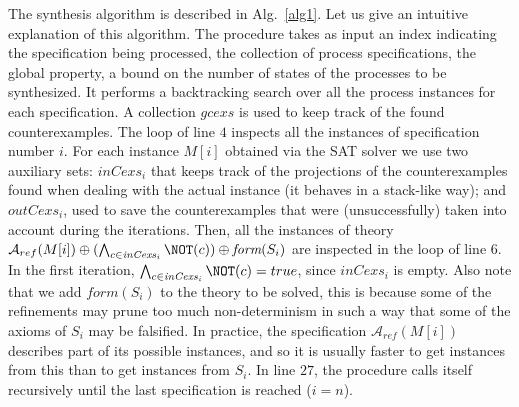 The synthesis algorithm is described in Alg.~\ref{alg1}. Let us give an intuitive explanation of this algorithm.
The procedure takes as input an index indicating the specification being processed, the collection of process specifications, the global property, a bound on the number of   states of the processes to be synthesized. It performs a backtracking search over all the process instances for each specification. A collection $\mathit{gcexs}$ is used to keep track of the found counterexamples. 
	 The loop of line $4$ inspects all the instances of specification number $i$. For each instance $M[i]$ obtained via the SAT solver we use two auxiliary sets: $\mathit{inCexs}_i$ that keeps track of the projections of the counterexamples found when dealing with the actual instance (it behaves in a stack-like way); and  $\mathit{outCexs}_i$, used to save the counterexamples that  were (unsuccessfully) taken into account during the iterations.	 Then, all the instances of theory $\mathcal{A}_{ref}(M[i])\oplus (\bigwedge_{c \in \mathit{inCexs}_i} \NOT(c)) \oplus \textit{form}(S_i)$ are inspected in the loop of line $6$. In the first iteration, $\bigwedge_{c \in \mathit{inCexs}_i} \NOT(c) = true$, since $\mathit{inCexs}_i$ is empty. Also note that we add $\mathit{form}(S_i)$ to the theory to be solved, this is because some of the refinements may prune too much non-determinism in such a way that some of the axioms of $S_i$ may be falsified. In practice, the specification $\mathcal{A}_{ref}(M[i])$ describes part of its possible instances, and so it is usually faster to get instances  from this than to get instances from $S_i$. 
	 In line $27$, the procedure calls itself recursively until the last specification is reached ($i=n$).
	 
